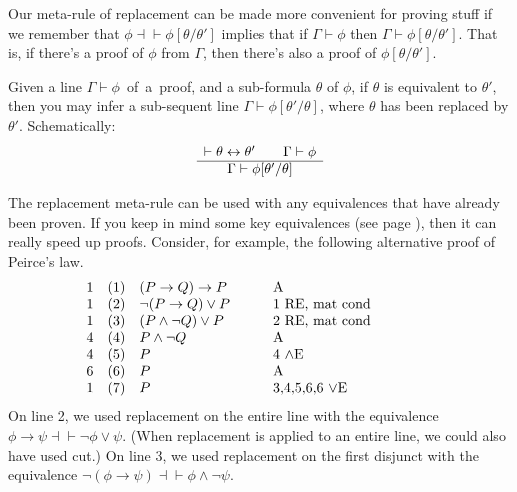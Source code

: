 Our meta-rule of replacement can be made more convenient for proving
stuff if we remember that $\phi\dashv\vdash\phi [\theta /\theta ']$
implies that if $\Gamma\vdash\phi$ then
$\Gamma\vdash\phi [\theta /\theta ']$.  That is, if there's a proof of
$\phi$ from $\Gamma$, then there's also a proof of
$\phi [\theta /\theta ']$.

\bigskip \begin{tcolorbox}[enhanced,width=10cm,title=replacement with
  an equivalent (RE),attach boxed title to top
  left={yshift=-2mm,xshift=4mm},boxed title style={sharp corners}]
  Given a line \mbox{$\Gamma\vdash\phi$ of a proof}, and a sub-formula
  $\theta$ of $\phi$, if $\theta$ is equivalent to $\theta '$, then
  you may infer a sub{-}sequent line
  $\Gamma\vdash\phi [\theta '/\theta]$, where $\theta$ has been
  replaced by $\theta '$.  Schematically: \[ \begin{array}{c c}
       \vdash\theta\leftrightarrow\theta ' \qquad \Gamma\vdash\phi \\ \hline
       \Gamma\vdash \phi [\theta '/\theta] \end{array} \]
\end{tcolorbox}

\bigskip The replacement meta-rule can be used with any equivalences
that have already been proven.  If you keep in mind some key
equivalences (see page \pageref{equivs}), then it can really speed up
proofs.  Consider, for example, the following alternative proof of
Peirce's law.
\[ \begin{array}{l l >{$}p{3cm}<{$} p{4cm}}
     1 & (1) & (P\to Q)\to P  & A \\
     1 & (2) & \neg (P\to Q)\vee P & 1 RE, mat cond \\
     1 & (3) & (P\wedge \neg Q)\vee P & 2 RE, mat cond \\
     4 & (4) & P\wedge \neg Q & A \\
     4 & (5) & P              & 4 $\wedge$E \\
     6 & (6) & P              & A \\
     1 & (7) & P & 3,4,5,6,6 $\vee$E \end{array} \]
On line 2, we used replacement on the entire line with the equivalence
$\phi\to\psi \dashv\vdash \neg\phi\vee \psi$.  (When replacement is applied
to an entire line, we could also have used cut.)  On line 3, we used
replacement on the first disjunct with the equivalence $\neg
(\phi\to\psi )\dashv\vdash \phi\wedge\neg\psi$.

